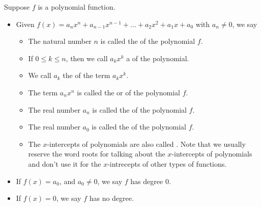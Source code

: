 \documentclass{ximera}
\begin{document}
\begin{definition}

Suppose $f$ is a polynomial function. 
\begin{itemize}
\item Given $f(x) = a_{n} x^{n} + a_{n-1} x^{n-1} + \ldots + a_{2} x^{2} + a_{1} x + a_{0}$ with $a_{n} \neq 0$, we say 

\begin{itemize}

\item  The natural number $n$ is called the  of the polynomial $f$.

\item  If $0 \leq k \leq n$, then we call $a_{k} x^{k}$ a  of the polynomial.  

\item  We call $a_k$ the  of the term $a_{k} x^{k}$. 

\item  The term $a_{n} x^{n}$ is called the  or  of the polynomial $f$.

\item  The real number $a_{n}$ is called the  of the polynomial $f$.

\item  The real number $a_{0}$ is called the  of the polynomial $f$.

\item  The $x$-intercepts of polynomials are also called .  Note that we usually reserve the word roots for talking about the $x$-intercepts of polynomials and don't use it for the $x$-intrecepts of other types of functions.

\end{itemize}

\item  If $f(x) = a_{0}$, and $a_{0} \neq 0$, we say $f$ has degree $0$.

\item  If $f(x) = 0$, we say $f$ has no degree.

\end{itemize}

\end{definition}
\end{document}
